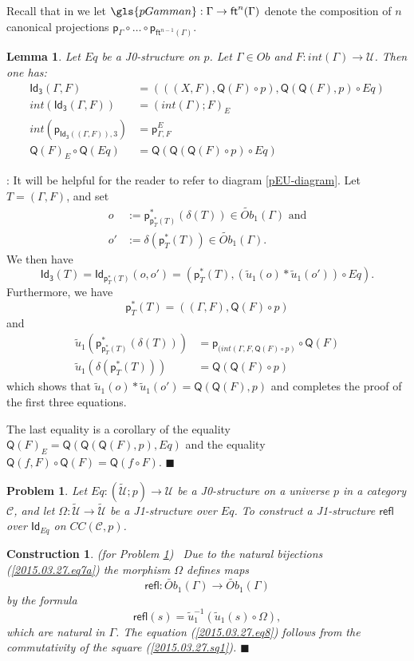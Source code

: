 \documentclass[12pt]{article}
\numberwithin{equation}{section}
\newenvironment{eq}{\begin{equation}}{\end{equation}}
\newenvironment{myproof}{{\bf Proof}:}{$\blacksquare$ \vskip 5mm }
\newtheorem{lemma}[proposition]{Lemma}
\newtheorem{problem}[proposition]{Problem}
\newtheorem{construction0}[proposition]{Construction}
\newenvironment{construction}[1]{\begin{construction0}(for Problem \ref{#1})\ }{$\blacksquare$ \end{construction0}}
\newcommand{\sr}{\rightarrow}
\newcommand{\wt}{\widetilde}
\newcommand{\toCC}{CC} %
\newcommand{\C}{{\mathcal C}}  %
\newcommand{\ft}{\mathsf{ft}}
\newcommand{\p}{\mathsf{p}}
\newcommand{\Id}{\mathsf{Id}} %
\newcommand{\Idx}{\mathsf{Id_3}} %
\newcommand{\refl}{\mathsf{refl}}
\newcommand{\U}{\mathcal{U}}
\newcommand{\Q}{\mathsf{Q}}
\newcommand{\Obwt}{\wt{Ob}}
\begin{document}
%
Recall that in \cite{Csubsystems} we let $\gls{pGamman}:\Gamma\sr \ft^n(\Gamma)$
denote the composition of $n$ canonical projections $\p_{\Gamma}\circ \dots\circ
\p_{\ft^{n-1}(\Gamma)}$.
%
\begin{lemma}
\label{2015.03.27.l1} Let $Eq$ be a J0-structure on $p$. Let $\Gamma\in Ob$
and $F:int(\Gamma)\sr \U$. Then one has:
%
\begin{align}
  \Idx(\Gamma,F) &= (((X,F),\Q(F)\circ p), \Q(\Q(F),p)\circ Eq) \label{2015.03.27.l1-IDx} \\
  int(\Idx(\Gamma,F))&=(int(\Gamma);F)_{E} \\
  int(\p_{\Idx((\Gamma,F)),3}) &= \p^E_{\Gamma,F} \\
  \Q(F)_{E}\circ \Q(Eq)&=\Q(\Q(\Q(F)\circ p)\circ Eq)
\end{align}
%
%
\end{lemma}
%
\begin{myproof}
It will be helpful for the reader to refer to diagram \ref{pEU-diagram}.
Let $T=(\Gamma,F)$, and set
\begin{align*}
  o &:=\p_{\p_T^*(T)}^*(\delta(T)) \in \Obwt_1(\Gamma) \text{ and}\\
  o'&:=\delta(\p_T^*(T)) \in \Obwt_1(\Gamma) .
\end{align*}
We then have
%
$$\Idx(T)=\Id_{\p_T^*(T)}(o,o')= (\p_T^*(T), (\wt{u}_1(o)*\wt{u}_1(o')) \circ Eq).$$
%
%
%
Furthermore, we have
%
$$\p_T^*(T) =((\Gamma,F),\Q(F)\circ p)$$
%
and
%
\begin{align*}
  \wt{u}_1(\p_{\p_T^*(T)}^*(\delta(T)))&=\p_{(int(\Gamma,F, \Q(F)\circ p)}\circ \Q(F) \\
  \wt{u}_1(\delta(\p_T^*(T)))&=\Q(\Q(F)\circ p)
\end{align*}
%
which shows that $\wt{u}_1(o)*\wt{u}_1(o')=\Q(\Q(F),p)$ and completes the proof
of the first three equations.

The last equality is a corollary of the equality $\Q(F)_{E}=\Q(\Q(\Q(F),p),Eq)$
and the equality $\Q(f,F)\circ \Q(F)=\Q(f\circ F)$.
\end{myproof}
%
\begin{problem}
\label{2015.03.27.prob4} Let $Eq:(\wt{\U};p)\sr \U$
be a J0-structure on a universe $p$ in a category $\C$,
and let $\Omega:\wt{\U}\sr \wt{\U}$ be a J1-structure over $Eq$.
To construct a J1-structure $\refl$ over $\Id_{Eq}$ on $\toCC({\C},p)$.
\end{problem}
%
\begin{construction}{2015.03.27.prob4}\rm
\label{2015.03.27.constr4} Due to the natural bijections
(\ref{2015.03.27.eq7a}) the morphism $\Omega$ defines maps
%
$$\refl:\Obwt_1(\Gamma)\sr \Obwt_1(\Gamma)$$
%
by the formula
%
\begin{eq}
  \label{refl-defn}
  \refl(s)=\wt{u}_1^{-1}(\wt{u}_1(s)\circ \Omega),
\end{eq}%
which are natural in $\Gamma$. The equation (\ref{2015.03.27.eq8}) follows from
the commutativity of the square (\ref{2015.03.27.sq1}).
\end{construction}
\end{document}
